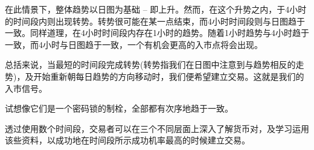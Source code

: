 在此情景下，整体趋势以日图为基础 – 即上升。然而，在这个升势之内，于4小时的时间段内则出现转势。转势很可能在某一点结束，而4小时时间段则与日图趋于一致。同样道理，在4小时时间段内存在1小时的趋势。随着1小时趋势与4小时趋于一致，而4小时与日图趋于一致，一个有机会更高的入市点将会出现。

总括来说，当最短的时间段完成转势(转势指我们在日图中注意到与趋势相反的走势)，及开始重新朝每日趋势的方向移动时，我们便希望建立交易。这就是我们的入市信号。

试想像它们是一个密码锁的制栓，全部都有次序地趋于一致。

透过使用数个时间段，交易者可以在三个不同层面上深入了解货币对，及学习运用该些资料，以成功地在时间段所示成功机率最高的时候建立交易。

